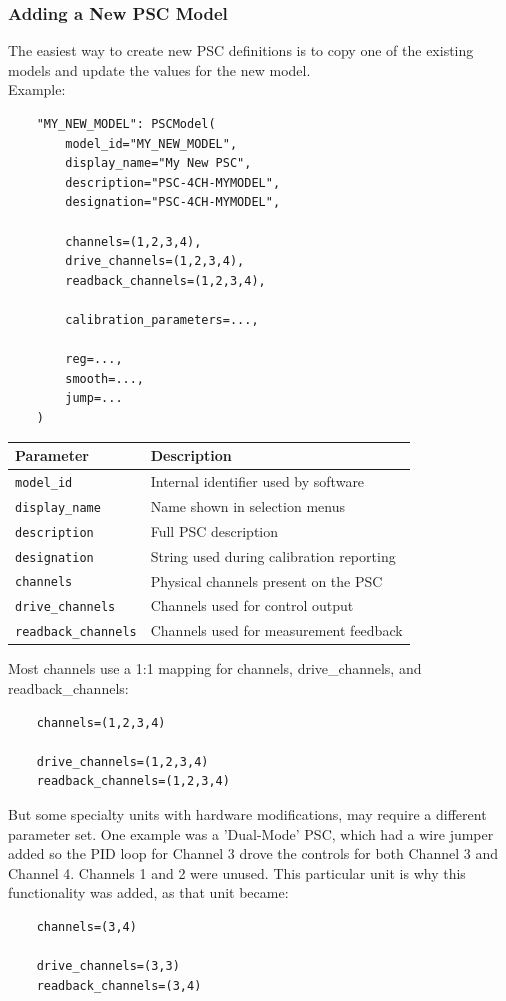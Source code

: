 \subsubsection{Adding a New PSC Model}
The easiest way to create new PSC definitions is to copy one of the existing models and update the values for the new model.\\
Example:
\begin{verbatim}
	"MY_NEW_MODEL": PSCModel(
		model_id="MY_NEW_MODEL",
		display_name="My New PSC",
		description="PSC-4CH-MYMODEL",
		designation="PSC-4CH-MYMODEL",
		
		channels=(1,2,3,4),
		drive_channels=(1,2,3,4),
		readback_channels=(1,2,3,4),
		
		calibration_parameters=...,
		
		reg=...,
		smooth=...,
		jump=...
	)
\end{verbatim}
\medskip
{}
\par\medskip
\begin{table}[ht]
	\centering
	\begin{tabular}{lp{10cm}}
		\toprule
		\textbf{Parameter} & \textbf{Description} \\
		\midrule
		\texttt{model\_id}          & Internal identifier used by software \\
		\texttt{display\_name}      & Name shown in selection menus \\
		\texttt{description}        & Full PSC description \\
		\texttt{designation}        & String used during calibration reporting \\
		\texttt{channels}           & Physical channels present on the PSC \\
		\texttt{drive\_channels}    & Channels used for control output \\
		\texttt{readback\_channels} & Channels used for measurement feedback \\
		\bottomrule
	\end{tabular}
	\label{tab:psc-parameters}
\end{table}
\medskip
Most channels use a 1:1 mapping for channels, drive\_channels, and readback\_channels:\\
\begin{verbatim}
	channels=(1,2,3,4)
	
	drive_channels=(1,2,3,4)
	readback_channels=(1,2,3,4)
\end{verbatim}
But some specialty units with hardware modifications, may require a different parameter set. One example was a 'Dual-Mode' PSC, which had a wire jumper added so the PID loop for Channel 3 drove the controls for both Channel 3 and Channel 4. Channels 1 and 2 were unused. This particular unit is why this functionality was added, as that unit became:\\
\begin{verbatim}
	channels=(3,4)
	
	drive_channels=(3,3)
	readback_channels=(3,4)
\end{verbatim}
















